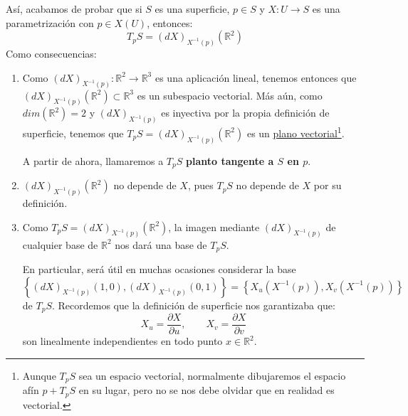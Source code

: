 \noindent
Así, acabamos de probar que si $S$ es una superficie, $p\in S$ y $X:U\to S$ es una parametrización con $p\in X(U)$, entonces:
\begin{equation*}
    \boxed{T_pS = (dX)_{X^{-1}(p)}\left(\mathbb{R}^2\right)}
\end{equation*}
Como consecuencias:
\begin{enumerate}
    \item Como $(dX)_{X^{-1}(p)}:\mathbb{R}^2\to \mathbb{R}^3$ es una aplicación lineal, tenemos entonces que $(dX)_{X^{-1}(p)}(\mathbb{R}^2)\subset \mathbb{R}^3$ es un subespacio vectorial. Más aún, como $dim(\mathbb{R}^2) = 2$ y $(dX)_{X^{-1}(p)}$ es inyectiva por la propia definición de superficie, tenemos que $T_pS=(dX)_{X^{-1}(p)}(\mathbb{R}^2)$ es un \underline{plano vectorial}\footnote{Aunque $T_pS$ sea un espacio vectorial, normalmente dibujaremos el espacio afín $p+T_pS$ en su lugar, pero no se nos debe olvidar que en realidad es vectorial.}.

        A partir de ahora, llamaremos a $T_pS$ \textbf{planto tangente a $S$ en $p$}.

    \item $(dX)_{X^{-1}(p)}\left(\mathbb{R}^2\right)$ no depende de $X$, pues $T_pS$ no depende de $X$ por su definición.
    \item Como $T_pS = (dX)_{X^{-1}(p)}\left(\mathbb{R}^2\right)$, la imagen mediante $(dX)_{X^{-1}(p)}$ de cualquier base de $\mathbb{R}^2$ nos dará una base de $T_pS$.

        En particular, será útil en muchas ocasiones considerar la base
        \begin{equation*}
            \left\{(dX)_{X^{-1}(p)}(1,0), (dX)_{X^{-1}(p)}(0,1)\right\} = \left\{X_u(X^{-1}(p)), X_v(X^{-1}(p))\right\}
        \end{equation*}
        de $T_pS$. Recordemos que la definición de superficie nos garantizaba que: 
        \begin{equation*}
            X_u = \frac{\partial X}{\partial u}, \qquad X_v = \frac{\partial X}{\partial v}
        \end{equation*}
        son linealmente independientes en todo punto $x\in \mathbb{R}^2$.
\end{enumerate}

